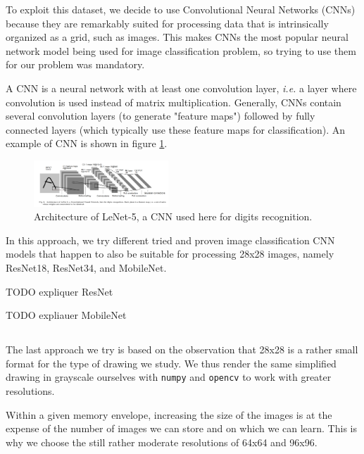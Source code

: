 \documentclass[10pt,twocolumn,letterpaper]{article}
\begin{document}
To exploit this dataset, we decide to use Convolutional Neural Networks (CNNs) because they are remarkably suited for processing data that is intrinsically organized as a grid, such as images. This makes CNNs the most popular neural network model being used for image classification problem, so trying to use them for our problem was mandatory.

A CNN is a neural network with at least one convolution layer, \textit{i.e.} a layer where convolution is used instead of matrix multiplication. Generally, CNNs contain several convolution layers (to generate "feature maps") followed by fully connected layers (which typically use these feature maps for classification). An example of CNN is shown in figure \ref{fig:lenet5}.

\begin{figure}[h] 
\centering
\includegraphics[width=0.45\textwidth]{images/cnn_lenet5.png}
\caption{Architecture of LeNet-5, a CNN used here for digits recognition. \cite{lecun-98}}
\label{fig:lenet5}
\end{figure}

In this approach, we try different tried and proven image classification CNN models that happen to also be suitable for processing 28x28 images, namely ResNet18, ResNet34, and MobileNet.

TODO expliquer ResNet

TODO expliauer MobileNet

\subsection{\imgenTitle{}}

The last approach we try is based on the observation that 28x28 is a rather small format for the type of drawing we study. We thus render the same simplified drawing in grayscale ourselves with \texttt{numpy} and \texttt{opencv} to work with greater resolutions.

Within a given memory envelope, increasing the size of the images is at the expense of the number of images we can store and on which we can learn. This is why we choose the still rather moderate resolutions of 64x64 and 96x96.
\end{document}
